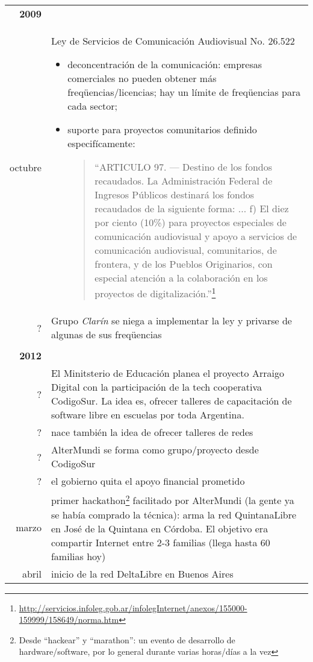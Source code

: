 \begin{longtable}{ r | p{}}
\textbf{2009} & \\
octubre & Ley de Servicios de Comunicación Audiovisual No. 26.522
  \begin{itemize}
    \item deconcentración de la comunicación: empresas comerciales no pueden obtener más freqüencias/licencias; hay un límite de freqüencias para cada sector;
    \item suporte para proyectos comunitarios definido especifícamente:
    \begin{quotation}
``ARTICULO 97. — Destino de los fondos recaudados. La Administración Federal de Ingresos Públicos destinará los fondos recaudados de la siguiente forma:
...
f) El diez por ciento (10\%) para proyectos especiales de comunicación audiovisual y apoyo a servicios de comunicación audiovisual, comunitarios, de frontera, y de los Pueblos Originarios, con especial atención a la colaboración en los proyectos de digitalización.''\footnote{\url{http://servicios.infoleg.gob.ar/infolegInternet/anexos/155000-159999/158649/norma.htm}}
\end{quotation}
  \end{itemize}\\
 ? & Grupo \textit{Clarín} se niega a implementar la ley y privarse de algunas de sus freqüencias\\
  & \\
\textbf{2012} & \\
  ? & El Minitsterio de Educación planea el proyecto Arraigo Digital con la participación de la tech cooperativa CodigoSur. La idea es, ofrecer talleres de capacitación de software libre en escuelas por toda Argentina. \\
  ? & nace también la idea de ofrecer talleres de redes \\
  ? & AlterMundi se forma como grupo/proyecto desde CodigoSur \\
  ? & el gobierno quita el apoyo financial prometido \\
  marzo & primer hackathon\footnote{Desde ``hackear'' y ``marathon'': un evento de desarrollo de hardware/software, por lo general durante varias horas/días a la vez} facilitado por AlterMundi (la gente ya se había comprado la técnica): arma la red QuintanaLibre en José de la Quintana en Córdoba. El objetivo era compartir Internet entre 2-3 familias (llega hasta 60 familias hoy) \\
  abril & inicio de la red DeltaLibre en Buenos Aires \\

\end{longtable}
